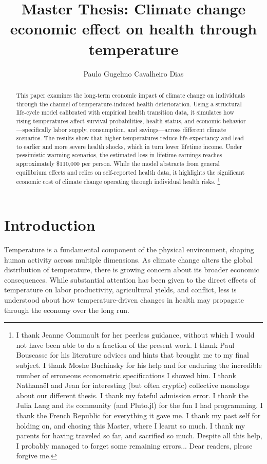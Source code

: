 \documentclass{article}
\author{Paulo Gugelmo Cavalheiro Dias}
\title{Master Thesis: Climate change economic effect on health through temperature}
\begin{document}
\maketitle

\begin{abstract}
    This paper examines the long-term economic impact of climate change on individuals through the channel of temperature-induced health deterioration. Using a structural life-cycle model calibrated with empirical health transition data, it simulates how rising temperatures affect survival probabilities, health status, and economic behavior—specifically labor supply, consumption, and savings—across different climate scenarios. The results show that higher temperatures reduce life expectancy and lead to earlier and more severe health shocks, which in turn lower lifetime income. Under pessimistic warming scenarios, the estimated loss in lifetime earnings reaches approximately \$110,000 per person. While the model abstracts from general equilibrium effects and relies on self-reported health data, it highlights the significant economic cost of climate change operating through individual health risks.
    \footnote{
    I thank Jeanne Commault for her peerless guidance, without which I would not have been able to do a fraction of the present work. 
    I thank Paul Bouscasse for his literature advices and hints that brought me to my final subject.
    I thank Moshe Buchinsky for his help and for enduring the incredible number of erroneous econometric specifications I showed him.
    I thank Nathanaël and Jean for interesting (but often cryptic) collective monologs about our different thesis.
    I thank my fateful admission error.
    I thank the Julia Lang and its community (and Pluto.jl) for the fun I had programming.
    I thank the French Republic for everything it gave me.
    I thank my past self for holding on, and chosing this Master, where I learnt so much.
    I thank my parents for having traveled so far, and sacrified so much.
    Despite all this help, I probably managed to forget some remaining errors...
    Dear readers, please forgive me.}
\end{abstract}

\newpage
\tableofcontents

\newpage
\section{Introduction}
Temperature is a fundamental component of the
physical environment, shaping human activity
across multiple dimensions. As climate change
alters the global distribution of temperature,
there is growing concern about its broader
economic consequences. While substantial
attention has been given to the direct effects
of temperature on labor productivity,
agricultural yields, and conflict, less
is understood about how temperature-driven
changes in health may propagate through the
economy over the long run.
\end{document}
